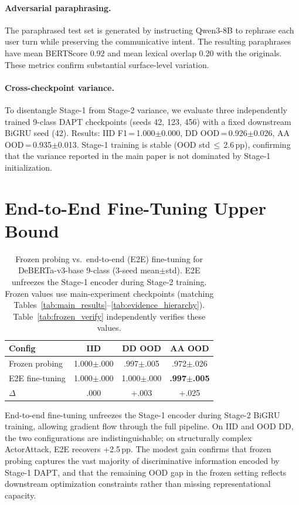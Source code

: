 \paragraph{Adversarial paraphrasing.}
The paraphrased test set is generated by instructing Qwen3-8B to rephrase each user turn while preserving the communicative intent. The resulting paraphrases have mean BERTScore 0.92 and mean lexical overlap 0.20 with the originals. These metrics confirm substantial surface-level variation.

\paragraph{Cross-checkpoint variance.}
To disentangle Stage-1 from Stage-2 variance, we evaluate three independently trained 9-class DAPT checkpoints (seeds 42, 123, 456) with a fixed downstream BiGRU seed (42). Results: IID F1\,=\,1.000$\pm$0.000, DD OOD\,=\,0.926$\pm$0.026, AA OOD\,=\,0.935$\pm$0.013. Stage-1 training is stable (OOD std\,$\leq$\,2.6\,pp), confirming that the variance reported in the main paper is not dominated by Stage-1 initialization.

\section{End-to-End Fine-Tuning Upper Bound}
\label{app:e2e}

\begin{table}[ht]
\centering
\footnotesize
\caption{Frozen probing vs.\ end-to-end (E2E) fine-tuning for DeBERTa-v3-base 9-class (3-seed mean$\pm$std). E2E unfreezes the Stage-1 encoder during Stage-2 training. Frozen values use main-experiment checkpoints (matching Tables~\ref{tab:main_results}--\ref{tab:evidence_hierarchy}). Table~\ref{tab:frozen_verify} independently verifies these values.}
\label{tab:e2e}
\begin{tabular}{@{}lccc@{}}
\toprule
\textbf{Config} & IID & DD OOD & AA OOD \\
\midrule
Frozen probing & 1.000$\pm$.000 & .997$\pm$.005 & .972$\pm$.026 \\
E2E fine-tuning & 1.000$\pm$.000 & 1.000$\pm$.000 & \textbf{.997$\pm$.005} \\
\midrule
$\Delta$ & .000 & +.003 & +.025 \\
\bottomrule
\end{tabular}
\end{table}

End-to-end fine-tuning unfreezes the Stage-1 encoder during Stage-2 BiGRU training, allowing gradient flow through the full pipeline. On IID and OOD DD, the two configurations are indistinguishable; on structurally complex ActorAttack, E2E recovers +2.5\,pp. The modest gain confirms that frozen probing captures the vast majority of discriminative information encoded by Stage-1 DAPT, and that the remaining OOD gap in the frozen setting reflects downstream optimization constraints rather than missing representational capacity.

